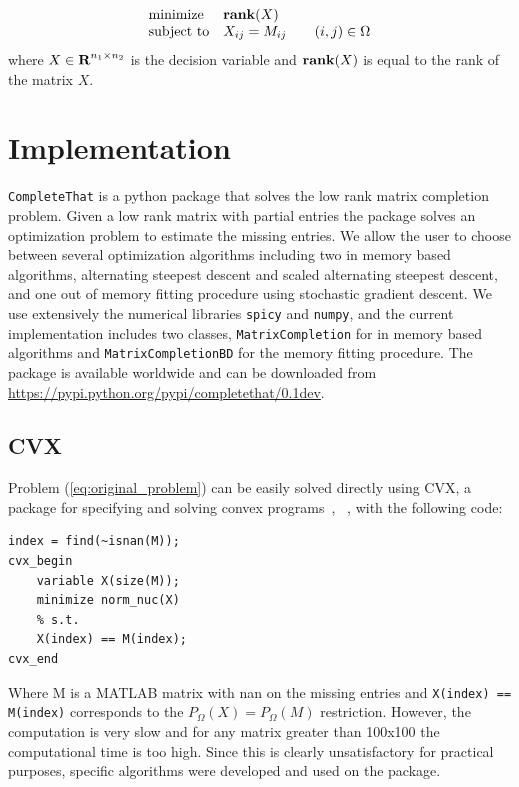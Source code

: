 \documentclass[12pt]{article}
\begin{document}
\begin{equation}
    \begin{array}{ll}
    \mbox{minimize}   &  \mathop{\bf rank}(X)\\
    \mbox{subject to} & X_{ij} = M_{ij} \qquad (i,j)\in \Omega
    \end{array}
    \label{eq:original_problem}
    \end{equation}
where $X\in {\mbox{\bf R}}^{n_1 \times n_2}$ is the decision variable and $\mathop{\bf rank}(X)$ is equal to the rank of the matrix $X$.


\section{Implementation}
\texttt{CompleteThat} is a python package that solves the low rank matrix completion problem. Given a low rank matrix with partial entries the package solves an optimization problem to estimate the missing entries. We allow the user to choose between several optimization algorithms including two in memory based algorithms, alternating steepest descent and scaled alternating steepest descent, and one out of memory fitting procedure using stochastic gradient descent. We use extensively the numerical libraries \texttt{spicy} and \texttt{numpy}, and the current implementation includes two classes, \texttt{MatrixCompletion} for in memory based algorithms and \texttt{MatrixCompletionBD} for the memory fitting procedure. The package is available worldwide and can be
downloaded from \url{https://pypi.python.org/pypi/completethat/0.1dev}.

\subsection*{CVX}
Problem (\ref{eq:original_problem}) can be easily solved directly using CVX, a package for specifying and solving convex programs~\cite{cvx}, ~\cite{gb08}, with the following code:

\begin{verbatim}
index = find(~isnan(M));
cvx_begin
    variable X(size(M));
    minimize norm_nuc(X)
    % s.t.
    X(index) == M(index);
cvx_end
\end{verbatim}

Where M is a MATLAB matrix with nan on the missing entries and \texttt{X(index) == M(index)} corresponds to the $P_{\Omega}(X) = P_{\Omega}(M)$ restriction. However, the computation is very slow and for any matrix greater than 100x100 the computational time is too high. Since this is clearly unsatisfactory for practical purposes, specific algorithms were developed and used on the package. 
\end{document}
